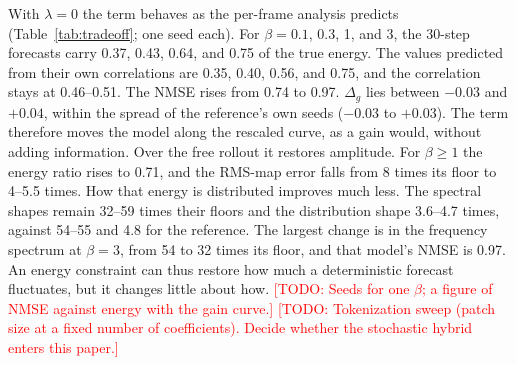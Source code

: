 \documentclass[conf]{new-aiaa}
\newcommand{\todo}[1]{\textcolor{red}{[TODO: #1]}}
\begin{document}
With $\lambda=0$ the term behaves as the per-frame analysis predicts (Table~\ref{tab:tradeoff}; one seed each). For $\beta=0.1$, 0.3, 1, and 3, the 30-step forecasts carry 0.37, 0.43, 0.64, and 0.75 of the true energy. The values predicted from their own correlations are 0.35, 0.40, 0.56, and 0.75, and the correlation stays at 0.46--0.51. The NMSE rises from 0.74 to 0.97. $\Delta_g$ lies between $-0.03$ and $+0.04$, within the spread of the reference's own seeds ($-0.03$ to $+0.03$). The term therefore moves the model along the rescaled curve, as a gain would, without adding information. Over the free rollout it restores amplitude. For $\beta\geq1$ the energy ratio rises to 0.71, and the RMS-map error falls from 8 times its floor to 4--5.5 times. How that energy is distributed improves much less. The spectral shapes remain 32--59 times their floors and the distribution shape 3.6--4.7 times, against 54--55 and 4.8 for the reference. The largest change is in the frequency spectrum at $\beta=3$, from 54 to 32 times its floor, and that model's NMSE is 0.97. An energy constraint can thus restore how much a deterministic forecast fluctuates, but it changes little about how. \todo{Seeds for one $\beta$; a figure of NMSE against energy with the gain curve.} \todo{Tokenization sweep (patch size at a fixed number of coefficients). Decide whether the stochastic hybrid enters this paper.}
\end{document}
